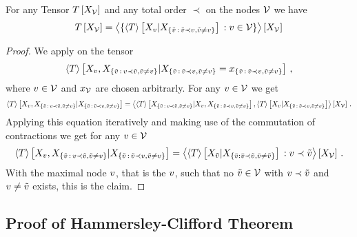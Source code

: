 \begin{theorem}\label{the:genericChainRule}
	For any Tensor $T\left[X_{\mathcal{V}}\right]$ and any total order $\prec$ on the nodes $\mathcal{V}$ we have %
	\begin{align*}
		T\left[X_{\mathcal{V}}\right] = 
		\left\langle 
			\{ \left\langle T\right\rangle \left[ X_{v} | X_{\{\tilde{v} \, : \, \tilde{v} \prec v, \tilde{v}\neq v\}} \right]  \, : v\in\mathcal{V} \}
		\right\rangle \left[ X_{\mathcal{V}} \right]
	\end{align*}
\end{theorem}
\begin{proof}
	We apply  on the tensor
	\begin{align*}
		\left\langle T\right\rangle \left[ 
			X_{v},X_{\{\tilde{v} \, : \, v \prec \tilde{v}, \tilde{v}\neq v\}}
		 | 
			X_{\{\tilde{v} \, : \, \tilde{v} \prec v, \tilde{v}\neq v\}}=x_{\{\tilde{v} \, : \, \tilde{v} \prec v, \tilde{v}\neq v\}}
		 \right] \, ,
	\end{align*}
	where $v\in\mathcal{V}$ and $x_{\mathcal{V}}$ are chosen arbitrarly.
	For any $v\in\mathcal{V}$ we get
	\begin{align*}
		\left\langle T\right\rangle \left[ 
			X_{v},X_{\{\tilde{v} \, : \, v \prec \tilde{v}, \tilde{v}\neq v\}}
			 | 
			X_{\{\tilde{v} \, : \, \tilde{v} \prec v, \tilde{v}\neq v\}}
		 \right] 
		= \left\langle 
			\left\langle T\right\rangle \left[ 
				X_{\{\tilde{v} \, : \, v \prec \tilde{v}, \tilde{v}\neq v\}}
				 | 
				X_{v},X_{\{\tilde{v} \, : \, \tilde{v} \prec v, \tilde{v}\neq v\}}
				 \right],
			\left\langle T\right\rangle \left[ 
				X_{v}
				 | 
				X_{\{\tilde{v} \, : \, \tilde{v} \prec v, \tilde{v}\neq v\}}
				 \right]
		\right\rangle \left[ 
			X_{\mathcal{V}} 
		 \right] \, .
	\end{align*}
	Applying this equation iteratively and making use of the commutation of contractions we get for any $v\in\mathcal{V}$
	\begin{align*}
		\left\langle T\right\rangle \left[ 
			X_{v},X_{\{\tilde{v} \, : \, v \prec \tilde{v}, \tilde{v}\neq v\}}
		 | 
			X_{\{\tilde{v} \, : \, \tilde{v} \prec v, \tilde{v}\neq v\}}
		 \right]
		= \left\langle 
			\left\langle T\right\rangle \left[ 
				X_{\tilde{v}}
			 | 
				X_{\{\bar{v} : \bar{v} \prec \tilde{v}, \bar{v}\neq\tilde{v}\}}
			 \right] 
			\, : v \prec \tilde{v}
		\right\rangle \left[ 
			X_{\mathcal{V}} 
		 \right] \, .
	\end{align*}
	With the maximal node $v$, that is the $v$, such that no $\tilde{v}\in\mathcal{V}$ with $v\prec\tilde{v}$ and $v\neq\tilde{v}$ exists, this is the claim.
\end{proof}




\subsection{Proof of Hammersley-Clifford Theorem}\label{sec:proofHCTheorem}


